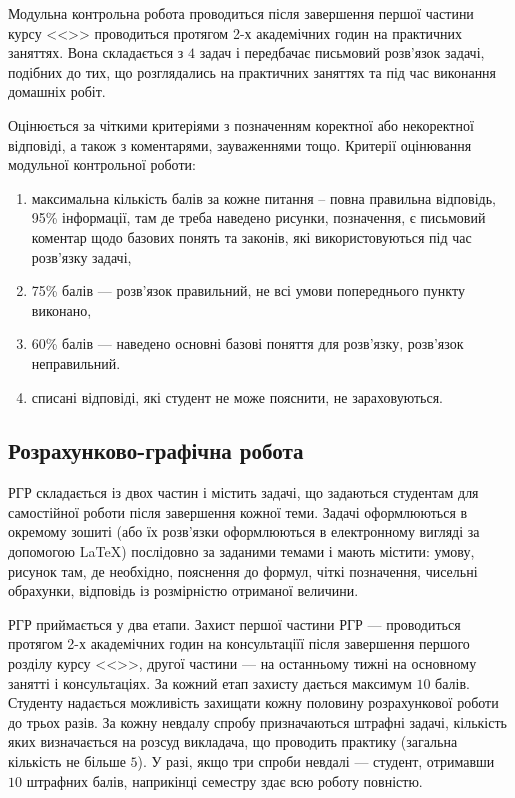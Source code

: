 \documentclass{Syllabus}
\begin{document}

Модульна контрольна робота проводиться після завершення першої частини курсу <<\discipline>> проводиться протягом 2-х академічних годин на практичних заняттях. Вона складається з $4$ задач і передбачає письмовий розв’язок задачі, подібних до тих, що розглядались на практичних заняттях та під час виконання домашніх робіт.

Оцінюється за чіткими критеріями з позначенням коректної або некоректної відповіді, а також з коментарями, зауваженнями тощо. Критерії оцінювання модульної контрольної роботи:
\begin{enumerate}[label=$\bullet$]
    \item максимальна кількість балів за кожне питання – повна правильна відповідь, 95\% інформації, там де треба наведено рисунки, позначення, є письмовий коментар щодо базових понять та законів, які використовуються під час розв’язку задачі,
    \item 75\% балів --- розв’язок правильний, не всі умови попереднього пункту виконано,
    \item 60\% балів --- наведено основні базові поняття для розв’язку, розв’язок неправильний.
    \item списані відповіді, які студент не може пояснити, не зараховуються.
\end{enumerate}


\subsection*{Розрахунково-графічна робота}


РГР складається із двох частин і містить задачі, що задаються студентам для самостійної роботи після завершення кожної теми. Задачі оформлюються в окремому зошиті (або їх розв'язки оформлюються в електронному вигляді за допомогою \LaTeX{}) послідовно за заданими темами і мають містити: умову, рисунок там, де необхідно, пояснення до формул, чіткі позначення, чисельні обрахунки, відповідь із розмірністю отриманої величини.

РГР приймається у два етапи. Захист першої частини РГР --- проводиться протягом 2-х академічних годин на консультаціїї після завершення першого розділу курсу <<\discipline>>, другої частини --- на останньому тижні на основному занятті і консультаціях. За кожний етап захисту дається максимум $10$ балів. Студенту надається можливість захищати кожну половину розрахункової роботи до трьох разів. За кожну невдалу спробу призначаються штрафні задачі, кількість яких визначається на розсуд викладача, що проводить практику (загальна кількість не більше $5$). У разі, якщо три спроби невдалі --- студент, отримавши $10$ штрафних балів, наприкінці семестру здає всю роботу повністю.
\end{document}
